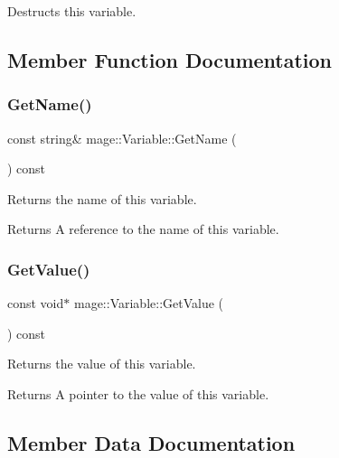 Destructs this variable. 

\subsection{Member Function Documentation}
\hypertarget{structmage_1_1_variable_a7f70fdadf34cdf6b26adc9910eade11d}{}\label{structmage_1_1_variable_a7f70fdadf34cdf6b26adc9910eade11d} 
\subsubsection{\texorpdfstring{Get\+Name()}{GetName()}}
{\footnotesize\ttfamily const string\& mage\+::\+Variable\+::\+Get\+Name (\begin{DoxyParamCaption}{ }\end{DoxyParamCaption}) const}

Returns the name of this variable.

\begin{DoxyReturn}{Returns}
A reference to the name of this variable. 
\end{DoxyReturn}
\hypertarget{structmage_1_1_variable_a65ecc95bcdc26733394d3a32d3d698f1}{}\label{structmage_1_1_variable_a65ecc95bcdc26733394d3a32d3d698f1} 
\subsubsection{\texorpdfstring{Get\+Value()}{GetValue()}}
{\footnotesize\ttfamily const void$\ast$ mage\+::\+Variable\+::\+Get\+Value (\begin{DoxyParamCaption}{ }\end{DoxyParamCaption}) const}

Returns the value of this variable.

\begin{DoxyReturn}{Returns}
A pointer to the value of this variable. 
\end{DoxyReturn}


\subsection{Member Data Documentation}
\hypertarget{structmage_1_1_variable_afac262aa51bb1dfe447d501abcaa08d0}{}\label{structmage_1_1_variable_afac262aa51bb1dfe447d501abcaa08d0} 
